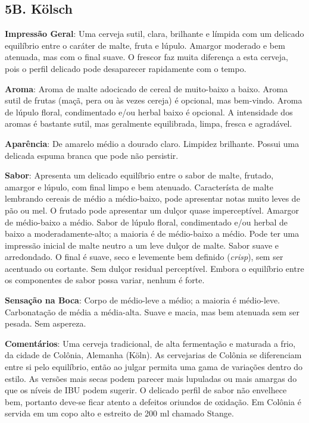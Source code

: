 \subsection*{5B. Kölsch}
\textbf{Impressão Geral}: Uma cerveja sutil, clara, brilhante e límpida com um delicado equilíbrio entre o caráter de malte, fruta e lúpulo. Amargor moderado e bem atenuada, mas com o final suave. O frescor faz muita diferença a esta cerveja, pois o perfil delicado pode desaparecer rapidamente com o tempo.

\textbf{Aroma}: Aroma de malte adocicado de cereal de muito-baixo a baixo. Aroma sutil de frutas (maçã, pera ou às vezes cereja) é opcional, mas bem-vindo. Aroma de lúpulo floral, condimentado e/ou herbal baixo é opcional. A intensidade dos aromas é bastante sutil, mas geralmente equilibrada, limpa, fresca e agradável.

\textbf{Aparência}: De amarelo médio a dourado claro. Limpidez brilhante. Possui uma delicada espuma branca que pode não persistir.

\textbf{Sabor}: Apresenta um delicado equilíbrio entre o sabor de malte, frutado, amargor e lúpulo, com final limpo e bem atenuado. Característa de malte lembrando cereais de médio a médio-baixo, pode apresentar notas muito leves de pão ou mel. O frutado pode apresentar um dulçor quase imperceptível. Amargor de médio-baixo a médio. Sabor de lúpulo floral, condimentado e/ou herbal de baixo a moderadamente-alto; a maioria é de médio-baixo a médio. Pode ter uma impressão inicial de malte neutro a um leve dulçor de malte. Sabor suave e arredondado. O final é suave, seco e levemente bem definido (\textit{crisp}), sem ser acentuado ou cortante. Sem dulçor residual perceptível. Embora o equilíbrio entre os componentes de sabor possa variar, nenhum é forte.

\textbf{Sensação na Boca}: Corpo de médio-leve a médio; a maioria é médio-leve. Carbonatação de média a média-alta. Suave e macia, mas bem atenuada sem ser pesada. Sem aspereza.

\textbf{Comentários}: Uma cerveja tradicional, de alta fermentação e maturada a frio, da cidade de Colônia, Alemanha (Köln). As cervejarias de Colônia se diferenciam entre si pelo equilíbrio, então ao julgar permita uma gama de variações dentro do estilo. As versões mais secas podem parecer mais lupuladas ou mais amargas do que os níveis de IBU podem sugerir. O delicado perfil de sabor não envelhece bem, portanto deve-se ficar atento a defeitos oriundos de oxidação. Em Colônia é servida em um copo alto e estreito de 200 ml chamado Stange.

